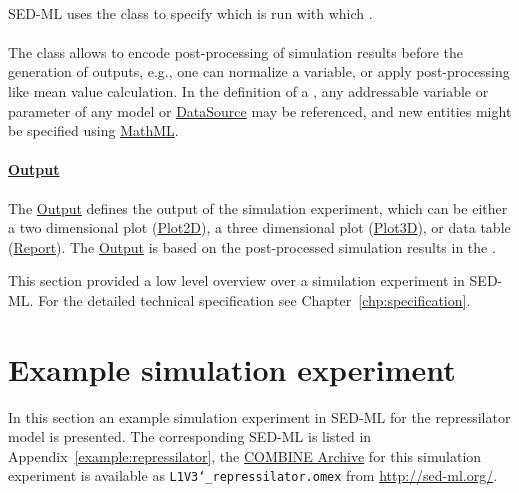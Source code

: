 \paragraph*{\Task}
SED-ML uses the \Task class to specify which \Simulation is run with which \Model.

\paragraph*{\DataGenerator}
The \DataGenerator class allows to encode post-processing of simulation results before the generation of outputs, e.g., one can normalize a variable, or apply post-processing like mean value calculation. In the definition of a \DataGenerator, any addressable variable or parameter of any model or \hyperref[class:dataSource]{DataSource} may be referenced, and new entities might be specified using \hyperref[sec:mathML]{MathML}.

\paragraph*{\hyperref[class:output]{Output}}
The \hyperref[class:output]{Output} defines the output of the simulation experiment, which can be either a two dimensional plot (\hyperref[class:plot2D]{Plot2D}), a three dimensional plot (\hyperref[class:plot3D]{Plot3D}), or data table (\hyperref[class:report]{Report}). The \hyperref[class:output]{Output} is based on the post-processed simulation results in the \DataGenerator.

This section provided a low level overview over a simulation experiment in SED-ML. For the detailed technical specification see Chapter~\ref{chp:specification}. 

\section{Example simulation experiment}
\label{motivation:example}
In this section an example simulation experiment in SED-ML for the repressilator model \citep{Elowitz:2000} is presented. The corresponding SED-ML is listed in Appendix~\ref{example:repressilator}, the \hyperref[sec:archive]{COMBINE Archive} for this simulation experiment is available as \texttt{L1V3\char`_repressilator.omex} from \url{http://sed-ml.org/}.

